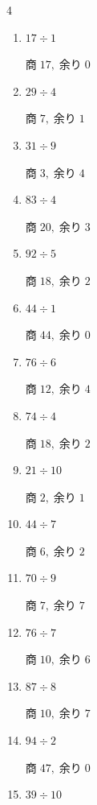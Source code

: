 \begin{multicols}{4}
\begin{enumerate}
        $商\; 19,\; 余り\; 1$

  \item $17 \div 1$

        $商\; 17,\; 余り\; 0$

  \item $29 \div 4$

        $商\; 7,\; 余り\; 1$

  \item $31 \div 9$

        $商\; 3,\; 余り\; 4$

  \item $83 \div 4$

        $商\; 20,\; 余り\; 3$

  \item $92 \div 5$

        $商\; 18,\; 余り\; 2$

  \item $44 \div 1$

        $商\; 44,\; 余り\; 0$

  \item $76 \div 6$

        $商\; 12,\; 余り\; 4$

  \item $74 \div 4$

        $商\; 18,\; 余り\; 2$

  \item $21 \div 10$

        $商\; 2,\; 余り\; 1$

\columnbreak %

  \item $44 \div 7$

        $商\; 6,\; 余り\; 2$

  \item $70 \div 9$

        $商\; 7,\; 余り\; 7$

  \item $76 \div 7$

        $商\; 10,\; 余り\; 6$

  \item $87 \div 8$

        $商\; 10,\; 余り\; 7$

  \item $94 \div 2$

        $商\; 47,\; 余り\; 0$

  \item $39 \div 10$


\end{enumerate}
\end{multicols}
